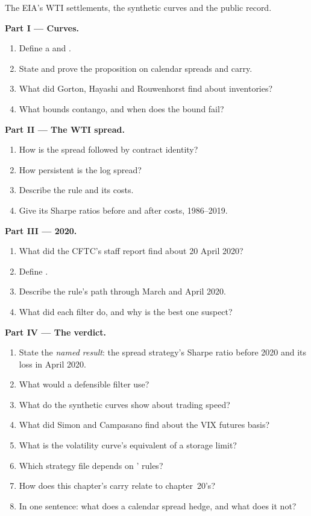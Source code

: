 \begin{problem}\label{pb:s1:calendar-spreads-and-curve-trades:1}
The EIA's WTI settlements, the synthetic curves and the public record.

\medskip\noindent\textbf{Part I --- Curves.}
\begin{enumerate}
\item Define a  and .
\item State and prove the proposition on calendar spreads and carry.
\item What did Gorton, Hayashi and Rouwenhorst find about inventories?
\item What bounds contango, and when does the bound fail?
\end{enumerate}

\medskip\noindent\textbf{Part II --- The WTI spread.}
\begin{enumerate}[resume]
\item How is the spread followed by contract identity?
\item How persistent is the log spread?
\item Describe the rule and its costs.
\item Give its Sharpe ratios before and after costs, 1986--2019.
\end{enumerate}

\medskip\noindent\textbf{Part III --- 2020.}
\begin{enumerate}[resume]
\item What did the CFTC's staff report find about 20 April 2020?
\item Define .
\item Describe the rule's path through March and April 2020.
\item What did each filter do, and why is the best one suspect?
\end{enumerate}

\medskip\noindent\textbf{Part IV --- The verdict.}
\begin{enumerate}[resume]
\item State the \emph{named result}: the spread strategy's Sharpe ratio before 2020 and its loss in April 2020.
\item What would a defensible filter use?
\item What do the synthetic curves show about trading speed?
\item What did Simon and Campasano find about the VIX futures basis?
\item What is the volatility curve's equivalent of a storage limit?
\item Which strategy file depends on ' rules?
\item How does this chapter's carry relate to chapter~20's?
\item In one sentence: what does a calendar spread hedge, and what does it not?
\end{enumerate}
\end{problem}

